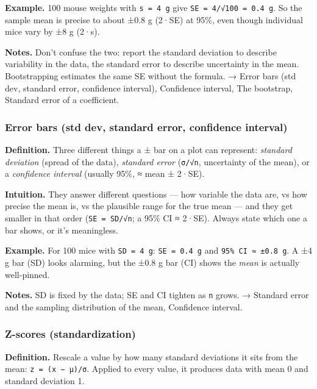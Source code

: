 \documentclass[
  10pt,
  letterpaper,
  onecolumn]{article}
\begin{document}
\textbf{Example.} 100 mouse weights with \texttt{s\ =\ 4\ g} give
\texttt{SE\ =\ 4/√100\ =\ 0.4\ g}. So the sample mean is precise to
about ±0.8 g (2·SE) at 95\%, even though individual mice vary by ±8 g
(2·s).

\textbf{Notes.} Don't confuse the two: report the standard deviation to
describe variability in the data, the standard error to describe
uncertainty in the mean. Bootstrapping estimates the same SE without the
formula. → Error bars (std dev, standard error, confidence interval),
Confidence interval, The bootstrap, Standard error of a coefficient.

\hypertarget{error-bars-std-dev-standard-error-confidence-interval}{%
\subsubsection{Error bars (std dev, standard error, confidence
interval)}\label{error-bars-std-dev-standard-error-confidence-interval}}

\textbf{Definition.} Three different things a ± bar on a plot can
represent: \emph{standard deviation} (spread of the data),
\emph{standard error} (\texttt{σ/√n}, uncertainty of the mean), or a
\emph{confidence interval} (usually 95\%, ≈ mean ± 2·SE).

\textbf{Intuition.} They answer different questions --- how variable the
data are, vs how precise the mean is, vs the plausible range for the
true mean --- and they get smaller in that order (\texttt{SE\ =\ SD/√n};
a 95\% CI ≈ 2·SE). Always state which one a bar shows, or it's
meaningless.

\textbf{Example.} For 100 mice with \texttt{SD\ =\ 4\ g}:
\texttt{SE\ =\ 0.4\ g} and \texttt{95\%\ CI\ ≈\ ±0.8\ g}. A ±4 g bar
(SD) looks alarming, but the ±0.8 g bar (CI) shows the \emph{mean} is
actually well-pinned.

\textbf{Notes.} SD is fixed by the data; SE and CI tighten as \texttt{n}
grows. → Standard error and the sampling distribution of the mean,
Confidence interval.

\hypertarget{z-scores-standardization}{%
\subsubsection{Z-scores
(standardization)}\label{z-scores-standardization}}

\textbf{Definition.} Rescale a value by how many standard deviations it
sits from the mean: \texttt{z\ =\ (x\ −\ μ)/σ}. Applied to every value,
it produces data with mean 0 and standard deviation 1.
\end{document}
